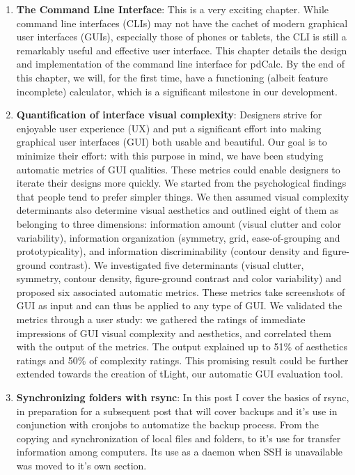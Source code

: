 \begin{englishtext}
\begin{enumerate}
    \item \textbf{The Command Line Interface}: This is a very exciting chapter.
    While command line interfaces (CLIs) may not have the cachet of modern
    graphical user interfaces (GUIs), especially those of phones or tablets, the
    CLI is still a remarkably useful and effective user interface. This chapter
    details the design and implementation of the command line interface for
    pdCalc. By the end of this chapter, we will, for the first time, have a
    functioning (albeit feature incomplete) calculator, which is a significant
    milestone in our development. \cite{commandLineInterface}

    \item \textbf{Quantification of interface visual complexity}: Designers
    strive for enjoyable user experience (UX) and put a significant effort into
    making graphical user interfaces (GUI) both usable and beautiful. Our goal
    is to minimize their effort: with this purpose in mind, we have been
    studying automatic metrics of GUI qualities. These metrics could enable
    designers to iterate their designs more quickly. We started from the
    psychological findings that people tend to prefer simpler things. We then
    assumed visual complexity determinants also determine visual aesthetics and
    outlined eight of them as belonging to three dimensions: information amount
    (visual clutter and color variability), information organization (symmetry,
    grid, ease-of-grouping and prototypicality), and information
    discriminability (contour density and figure-ground contrast). We
    investigated five determinants (visual clutter, symmetry, contour density,
    figure-ground contrast and color variability) and proposed six associated
    automatic metrics. These metrics take screenshots of GUI as input and can
    thus be applied to any type of GUI. We validated the metrics through a user
    study: we gathered the ratings of immediate impressions of GUI visual
    complexity and aesthetics, and correlated them with the output of the
    metrics. The output explained up to 51\% of aesthetics ratings and 50\% of
    complexity ratings. This promising result could be further extended towards
    the creation of tLight, our automatic GUI evaluation tool.
    \cite{quantificationOfInterface}

    \item \textbf{Synchronizing folders with rsync}: In this post I cover the
    basics of rsync, in preparation for a subsequent post that will cover
    backups and it's use in conjunction with cronjobs to automatize the backup
    process. From the copying and synchronization of local files and folders, to
    it's use for transfer information among computers. Its use as a daemon when
    SSH is unavailable was moved to it's own section.
    \cite{synchronizingFolders}


\end{enumerate}
\end{englishtext}
